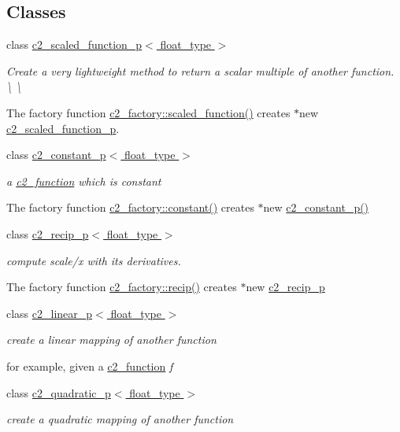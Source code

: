 \subsection*{Classes}
\begin{DoxyCompactItemize}
\item 
class \hyperlink{classc2__scaled__function__p}{c2\+\_\+scaled\+\_\+function\+\_\+p$<$ float\+\_\+type $>$}
\begin{DoxyCompactList}\small\item\em Create a very lightweight method to return a scalar multiple of another function. \textbackslash{} \textbackslash{}

The factory function \hyperlink{classc2__factory_a81a7b686b7ffa389ad4dcd8d18997332}{c2\+\_\+factory\+::scaled\+\_\+function()} creates $\ast$new \hyperlink{classc2__scaled__function__p}{c2\+\_\+scaled\+\_\+function\+\_\+p}. \end{DoxyCompactList}\item 
class \hyperlink{classc2__constant__p}{c2\+\_\+constant\+\_\+p$<$ float\+\_\+type $>$}
\begin{DoxyCompactList}\small\item\em a \hyperlink{classc2__function}{c2\+\_\+function} which is constant

The factory function \hyperlink{classc2__factory_a98e385b2b927d15d4376821302061d4d}{c2\+\_\+factory\+::constant()} creates $\ast$new \hyperlink{classc2__constant__p_ae62311ccce870ca4fb79b7c9d525a3d2}{c2\+\_\+constant\+\_\+p()} \end{DoxyCompactList}\item 
class \hyperlink{classc2__recip__p}{c2\+\_\+recip\+\_\+p$<$ float\+\_\+type $>$}
\begin{DoxyCompactList}\small\item\em compute scale/x with its derivatives.

The factory function \hyperlink{classc2__factory_adda01279d6b1059843e2aecc5be5d95e}{c2\+\_\+factory\+::recip()} creates $\ast$new \hyperlink{classc2__recip__p}{c2\+\_\+recip\+\_\+p} \end{DoxyCompactList}\item 
class \hyperlink{classc2__linear__p}{c2\+\_\+linear\+\_\+p$<$ float\+\_\+type $>$}
\begin{DoxyCompactList}\small\item\em create a linear mapping of another function

for example, given a \hyperlink{classc2__function}{c2\+\_\+function} {\itshape f} \end{DoxyCompactList}\item 
class \hyperlink{classc2__quadratic__p}{c2\+\_\+quadratic\+\_\+p$<$ float\+\_\+type $>$}
\begin{DoxyCompactList}\small\item\em create a quadratic mapping of another function


\end{DoxyCompactList}
\end{DoxyCompactItemize}
